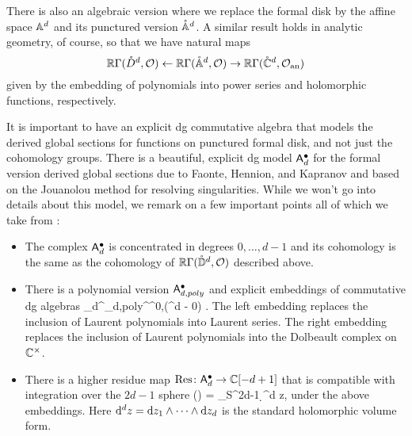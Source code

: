 \documentclass[11pt]{amsart}
\begin{document}
There is also an algebraic version where we replace the formal disk by the affine space $\AA^d$ and its punctured version $\mathring{\AA}^d$.
A similar result holds in analytic geometry, of course,
so that we have natural maps
\[
\RR \Gamma(\mathring{D}^d, \cO) \leftarrow \RR \Gamma(\mathring{\AA}^d, \cO) \to \RR \Gamma(\mathring{\CC}^d, \cO_{\rm an}) 
\]
given by the embedding of polynomials into power series and holomorphic functions, respectively.

It is important to have an explicit dg commutative algebra that models the derived global sections for functions on punctured formal disk,
and not just the cohomology groups.
There is a beautiful, explicit dg model $\sfA^\bu_d$ for the formal version derived global sections due to Faonte, Hennion, and Kapranov \cite{FHK} and based on the Jouanolou method for resolving singularities. 
While we won't go into details about this model, we remark on a few important points all of which we take from \cite{FHK}:
\begin{itemize}
\item The complex $\sfA^\bu_d$ is concentrated in degrees $0,\ldots,d-1$ and its cohomology is the same as the cohomology of $\RR \Gamma(\mathring{\DD}^d, \cO)$ described above.
\item There is a polynomial version $\sfA_{d,poly}^\bu$ and explicit embeddings of commutative dg algebras 
\beqn
\sfA_{d}^\bu \hookleftarrow \sfA_{d,poly}^\bu \hookrightarrow \Omega^{0,\bu}(\CC^d - 0) .
\eeqn
The left embedding replaces the inclusion of Laurent polynomials into Laurent series.
The right embedding replaces the inclusion of Laurent polynomials into the Dolbeault complex on $\CC^\times$.
\item There is a higher residue map $\text{Res} \colon \sfA_d^{\bu} \to \CC[-d+1]$ that is compatible with integration over the $2d-1$ sphere
\beqn
\label{eq:res}
\Res(\alpha) = \oint_{S^{2d-1}} \alpha \wedge \d^d z,
\eeqn
under the above embeddings.
Here $\d^d z = \d z_1 \wedge \cdots \wedge \d z_d$ is the standard holomorphic volume form.
\end{itemize}

\end{document}
